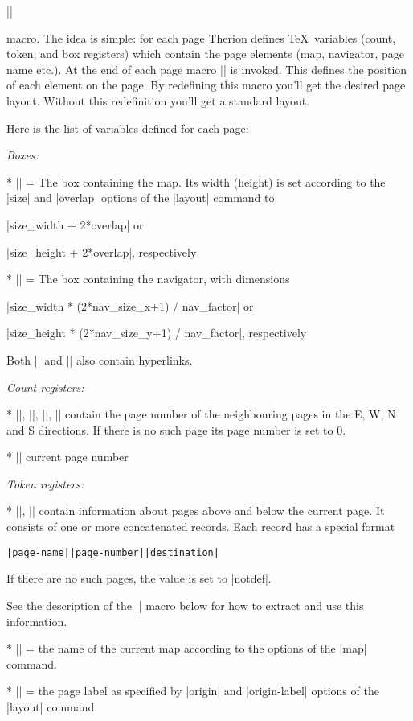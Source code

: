 |\dopage|

macro. The idea is simple: for each page Therion defines \TeX\ variables
(count, token, and box registers) which contain the page elements (map,
navigator, page name etc.). At the end of each page macro |\dopage| is invoked.
This defines the position of each element on the page. By redefining this macro
you'll get the desired page layout. Without this redefinition you'll get a
standard layout.

Here is the list of variables defined for each page:

\list
  {\it Boxes:}

  * |\mapbox| = The box containing the map. Its width (height) is set
    according to the |size| and |overlap| options of the |layout| command to

    |size_width + 2*overlap| or

    |size_height + 2*overlap|, respectively

  * |\navbox| = The box containing the navigator, with dimensions

    |size_width * (2*nav_size_x+1) / nav_factor| or

    |size_height * (2*nav_size_y+1) / nav_factor|, respectively

    Both |\mapbox| and |\navbox| also contain hyperlinks.

  {\it Count registers:}

  * |\pointerE|, |\pointerW|, |\pointerN|, |\pointerS| contain the page number
    of the neighbouring pages in the E, W, N and S directions. If there is no
    such page its page number is set to 0.

  * |\pagenum| current page number

  {\it Token registers:}

  * |\pointerU|, |\pointerD| contain information about pages above and below
    the current page. It consists of one or more concatenated records. Each
    record has a special format

    {\tt|page-name||page-number||destination|}

    If there are no such pages, the value is set to |notdef|.

    See the description of the |\processpointeritem| macro below for how to
    extract and use this information.

  * |\pagename| = the name of the current map according to the options of the |map|
    command.

  * |\pagelabel| = the page label as specified by |origin| and |origin-label|
    options of the |layout| command.
\endlist


